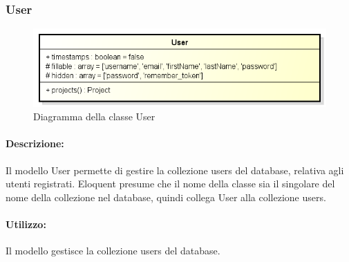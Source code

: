 \subsubsection{User}

	\begin{figure}[h]
		\centering
		\includegraphics[width=0.8\linewidth]{img/back_end_user_model}
		\caption[Diagramma della classe User]{Diagramma della classe User}
		\label{fig:back_end_user_model}
	\end{figure}


	\paragraph{Descrizione:}
	Il modello User permette di gestire la collezione users del database, relativa agli utenti registrati. Eloquent presume che il nome della classe sia il singolare del nome della collezione nel database, quindi collega User alla collezione users.

	\paragraph{Utilizzo:}
	Il modello gestisce la collezione users del database.
	
